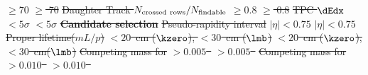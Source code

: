 \documentclass[ALICE,manyauthors]{cernphprep}
\providecommand{\DIFadd}[1]{{\protect\color{blue}\uwave{#1}}} %
\providecommand{\DIFdel}[1]{{\protect\color{red}\sout{#1}}}                      %
\providecommand{\DIFaddbegin}{} %
\providecommand{\DIFaddend}{} %
\providecommand{\DIFdelend}{} %
\providecommand{\DIFdelFL}[1]{\DIFdel{#1}} %
\begin{document}
\DIFdelFL{$\geq 70$  }%
\DIFdelFL{$\geq$ 70 }%
\DIFdelFL{Daughter Track $N_{\rm crossed~rows}/N_{\rm findable}$  }%
\DIFdelFL{$\geq 0.8$ }%
\DIFdelFL{$\geq$ 0.8 }%
\DIFdelFL{TPC $\dEdx$ }%
\DIFdelFL{$< 5\sigma$ }%
\DIFdelFL{$< 5\sigma$ }%
\textbf{\DIFdelFL{Candidate selection}} %
\DIFdelFL{Pseudo-rapidity interval }%
\DIFdelFL{$|\eta| < 0.75$ }%
\DIFdelFL{$|\eta| < 0.75$ }%
\DIFdelFL{Proper lifetime($mL/p$)  }%
\DIFdelFL{$< 20$~cm ($\kzero$), $< 30$~cm ($\lmb$) }%
\DIFdelFL{$<20$~cm ($\kzero$), $< 30$~cm($\lmb$) }%
\DIFdelFL{Competing mass for }%
\DIFdelFL{$> 0.005$~}%
\DIFdelFL{$> 0.005$~}%
\DIFdelFL{Competing mass for }%
\DIFdelFL{$> 0.010$~}%
\DIFdelFL{$> 0.010$~}%
\DIFdelend \DIFaddbegin \DIFadd{.
}\DIFaddend 
\end{document}
